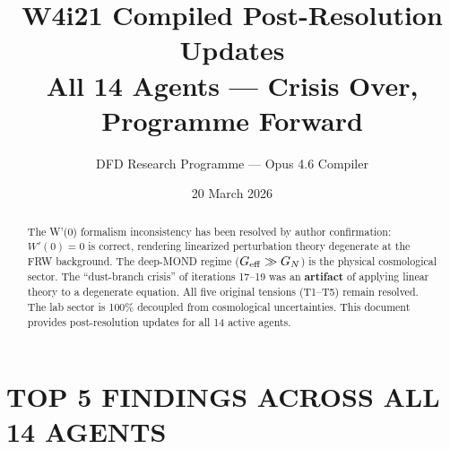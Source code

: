 \documentclass[11pt]{article}
\title{W4i21 Compiled Post-Resolution Updates\\
\large All 14 Agents --- Crisis Over, Programme Forward}
\author{DFD Research Programme --- Opus 4.6 Compiler}
\date{20 March 2026}
\begin{document}
\maketitle

\begin{abstract}
The W'(0) formalism inconsistency has been resolved by author confirmation:
$W'(0) = 0$ is correct, rendering linearized perturbation theory degenerate
at the FRW background. The deep-MOND regime ($G_{\rm eff} \gg G_N$) is the
physical cosmological sector. The ``dust-branch crisis'' of iterations 17--19
was an \textbf{artifact} of applying linear theory to a degenerate equation.
All five original tensions (T1--T5) remain resolved. The lab sector is 100\%
decoupled from cosmological uncertainties. This document provides post-resolution
updates for all 14 active agents.
\end{abstract}

\tableofcontents
\newpage

\section{TOP 5 FINDINGS ACROSS ALL 14 AGENTS}
\end{document}
